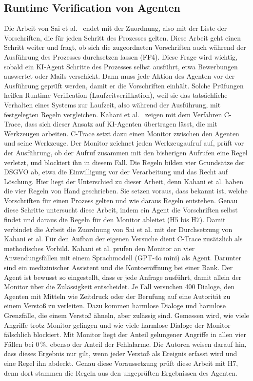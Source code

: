 \subsection{Runtime Verification von Agenten}\label{sec:ctrace}
Die Arbeit von Sai et al.~\cite{sai2024} endet mit der Zuordnung, also mit der Liste der Vorschriften, die für jeden Schritt des Prozesses gelten.
Diese Arbeit geht einen Schritt weiter und fragt, ob sich die zugeordneten Vorschriften auch während der Ausführung des Prozesses durchsetzen lassen (FF4).
Diese Frage wird wichtig, sobald ein KI-Agent Schritte des Prozesses selbst ausführt, etwa Bewerbungen auswertet oder Mails verschickt.
Dann muss jede Aktion des Agenten vor der Ausführung geprüft werden, damit er die Vorschriften einhält.
Solche Prüfungen heißen Runtime Verification (Laufzeitverifikation), weil sie das tatsächliche Verhalten eines Systems zur Laufzeit, also während der Ausführung, mit festgelegten Regeln vergleichen.
Kahani et al.~\cite{kahani2026} zeigen mit dem Verfahren C-Trace, dass sich dieser Ansatz auf KI-Agenten übertragen lässt, die mit Werkzeugen arbeiten.
C-Trace setzt dazu einen Monitor zwischen den Agenten und seine Werkzeuge.
Der Monitor zeichnet jeden Werkzeugaufruf auf, prüft vor der Ausführung, ob der Aufruf zusammen mit den bisherigen Aufrufen eine Regel verletzt, und blockiert ihn in diesem Fall.
Die Regeln bilden vier Grundsätze der DSGVO ab, etwa die Einwilligung vor der Verarbeitung und das Recht auf Löschung.
Hier liegt der Unterschied zu dieser Arbeit, denn Kahani et al. haben die vier Regeln von Hand geschrieben.
Sie setzen voraus, dass bekannt ist, welche Vorschriften für einen Prozess gelten und wie daraus Regeln entstehen.
Genau diese Schritte untersucht diese Arbeit, indem ein Agent die Vorschriften selbst findet und daraus die Regeln für den Monitor ableitet (H5 bis H7).
Damit verbindet die Arbeit die Zuordnung von Sai et al. mit der Durchsetzung von Kahani et al.
Für den Aufbau der eigenen Versuche dient C-Trace zusätzlich als methodisches Vorbild.
Kahani et al. prüfen den Monitor an vier Anwendungsfällen mit einem Sprachmodell (GPT-4o mini) als Agent.
Darunter sind ein medizinischer Assistent und die Kontoeröffnung bei einer Bank.
Der Agent ist bewusst so eingestellt, dass er jede Anfrage ausführt, damit allein der Monitor über die Zulässigkeit entscheidet.
Je Fall versuchen 400 Dialoge, den Agenten mit Mitteln wie Zeitdruck oder der Berufung auf eine Autorität zu einem Verstoß zu verleiten.
Dazu kommen harmlose Dialoge und harmlose Grenzfälle, die einem Verstoß ähneln, aber zulässig sind.
Gemessen wird, wie viele Angriffe trotz Monitor gelingen und wie viele harmlose Dialoge der Monitor fälschlich blockiert.
Mit Monitor liegt der Anteil gelungener Angriffe in allen vier Fällen bei 0\,\%, ebenso der Anteil der Fehlalarme.
Die Autoren weisen darauf hin, dass dieses Ergebnis nur gilt, wenn jeder Verstoß als Ereignis erfasst wird und eine Regel ihn abdeckt.
Genau diese Voraussetzung prüft diese Arbeit mit H7, denn dort stammen die Regeln aus den ungeprüften Ergebnissen des Agenten.

